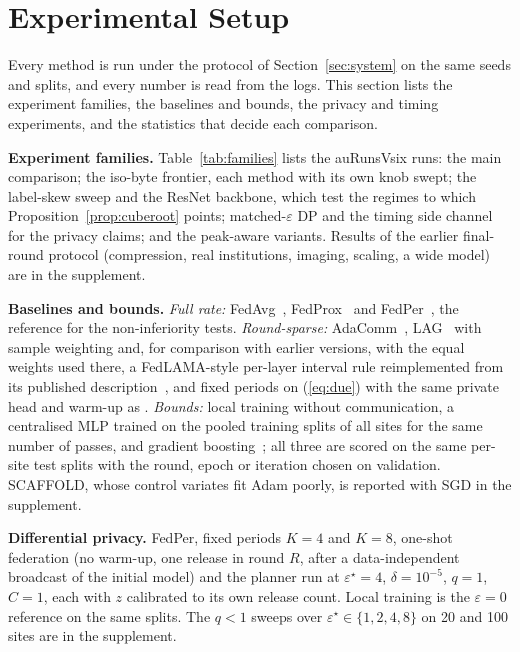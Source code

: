 \section{Experimental Setup}
\label{sec:setup}
Every method is run under the protocol of Section~\ref{sec:system} on the same seeds and splits, and every number is read from the logs. This section lists the experiment families, the baselines and bounds, the privacy and timing experiments, and the statistics that decide each comparison.

\begin{table}[t]
\caption{Experiment families of the v6 runs, counted from the logs: data and sites, configurations, seeds and runs}
\label{tab:families}
\centering\footnotesize
{}
\end{table}

\textbf{Experiment families.} Table~\ref{tab:families} lists the \num{auRunsVsix} runs: the main comparison; the iso-byte frontier, each method with its own knob swept; the label-skew sweep and the ResNet backbone, which test the regimes to which Proposition~\ref{prop:cuberoot} points; matched-$\varepsilon$ DP and the timing side channel for the privacy claims; and the peak-aware variants. Results of the earlier final-round protocol (compression, real institutions, imaging, scaling, a wide model) are in the supplement.

\textbf{Baselines and bounds.} \emph{Full rate:} FedAvg~\cite{mcmahan2017}, FedProx~\cite{li2020fedprox} and FedPer~\cite{arivazhagan2019}, the reference for the non-inferiority tests. \emph{Round-sparse:} AdaComm~\cite{wang2019adacomm}, LAG~\cite{chen2018lag} with sample weighting and, for comparison with earlier versions, with the equal weights used there, a FedLAMA-style per-layer interval rule reimplemented from its published description~\cite{lee2023fedlama}, and fixed periods on (\ref{eq:due}) with the same private head and warm-up as \tierfed{}. \emph{Bounds:} local training without communication, a centralised MLP trained on the pooled training splits of all sites for the same number of passes, and gradient boosting~\cite{ke2017lightgbm}; all three are scored on the same per-site test splits with the round, epoch or iteration chosen on validation. SCAFFOLD, whose control variates fit Adam poorly, is reported with SGD in the supplement.

\textbf{Differential privacy.} FedPer, fixed periods $K=4$ and $K=8$, one-shot federation (no warm-up, one release in round $R$, after a data-independent broadcast of the initial model) and the planner run at $\varepsilon^\star=4$, $\delta=10^{-5}$, $q=1$, $C=1$, each with $z$ calibrated to its own release count. Local training is the $\varepsilon=0$ reference on the same splits. The $q<1$ sweeps over $\varepsilon^\star\in\{1,2,4,8\}$ on 20 and 100 sites are in the supplement.

